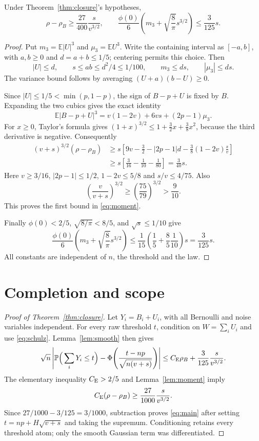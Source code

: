 \documentclass[11pt,a4paper]{article}
\newcommand{\E}{\mathbb E}\newcommand{\Pp}{\mathbb P}
\newcommand{\CE}{C_{\rm E}}
\begin{document}
\begin{lemma}\label{lem:moment}
Under Theorem~\ref{thm:closure}'s hypotheses,
\begin{equation}\label{eq:moment}
 \rho-\rho_B\ge\frac{27}{400}\frac{s}{v^{3/2}},
 \qquad
 \frac{\phi(0)}6\left(m_3+\sqrt{\frac8\pi}s^{3/2}\right)
       \le\frac3{125}s .
\end{equation}
\end{lemma}
\begin{proof}
Put $m_3=\E|U|^3$ and $\mu_3=\E U^3$. Write the containing interval as
$[-a,b]$, with $a,b\ge0$ and $d=a+b\le1/5$; centering permits this choice. Then
\[
 |U|\le d,\qquad s\le ab\le d^2/4\le1/100,\qquad
 m_3\le ds,\qquad |\mu_3|\le ds.
\]
The variance bound follows by averaging
$(U+a)(b-U)\ge0$.

Since $|U|\le1/5<\min(p,1-p)$, the sign of $B-p+U$ is fixed by $B$.
Expanding the two cubics gives the exact identity
\begin{equation}\label{eq:rawmoment}
 \E|B-p+U|^3=v(1-2v)+6vs+(2p-1)\mu_3.
\end{equation}
For $x\ge0$, Taylor's formula gives
$(1+x)^{3/2}\le1+\frac32x+\frac38x^2$, because the third derivative
is negative. Consequently
\begin{align*}
 (v+s)^{3/2}(\rho-\rho_B)
 &\ge s\left[9v-\frac32-|2p-1|d
              -\frac38(1-2v)\frac{s}{v}\right]\\
 &\ge s\left[\frac3{16}-\frac1{10}-\frac1{80}\right]
   =\frac3{40}s .
\end{align*}
Here $v\ge3/16$, $|2p-1|\le1/2$, $1-2v\le5/8$ and $s/v\le4/75$.
Also
\[
 \left(\frac{v}{v+s}\right)^{3/2}
 \ge\left(\frac{75}{79}\right)^{3/2}>\frac9{10}.
\]
This proves the first bound in \eqref{eq:moment}.

Finally $\phi(0)<2/5$, $\sqrt{8/\pi}<8/5$, and $\sqrt s\le1/10$ give
\[
 \frac{\phi(0)}6
       \left(m_3+\sqrt{\frac8\pi}s^{3/2}\right)
 \le\frac1{15}\left(\frac15+\frac85\frac1{10}\right)s
 =\frac3{125}s.
\]
All constants are independent of $n$, the threshold and the law.
\end{proof}

\section{Completion and scope}
\begin{proof}[Proof of Theorem~\ref{thm:closure}]
Let $Y_i=B_i+U_i$, with all Bernoulli and noise variables independent.
For every raw threshold $t$, condition on $W=\sum_iU_i$ and use
\eqref{eq:schulz}. Lemma~\ref{lem:smooth} then gives
\[
 \sqrt n\left|
 \Pp\Big(\sum_iY_i\le t\Big)
       -\Phi\!\left(\frac{t-np}{\sqrt{n(v+s)}}\right)\right|
 \le\CE\rho_B+\frac3{125}\frac{s}{v^{3/2}}.
\]
The elementary inequality $\CE>2/5$ and Lemma~\ref{lem:moment} imply
\[
 \CE(\rho-\rho_B)\ge\frac{27}{1000}\frac{s}{v^{3/2}}.
\]
Since $27/1000-3/125=3/1000$, subtraction proves \eqref{eq:main}
after setting $t=np+H\sqrt{v+s}$ and taking the supremum.
Conditioning retains every threshold atom; only the smooth Gaussian
term was differentiated.
\end{proof}
\end{document}
